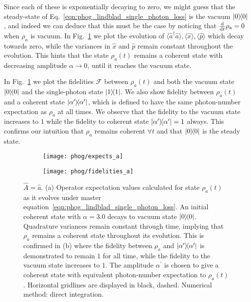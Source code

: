 \noindent Since each of these is exponentially decaying to zero, we might guess that the steady-state of Eq.~\ref{eqn:phog_lindblad_single_photon_loss} is the vacuum $\dyad{0}$, and indeed we can deduce that this must be the case by noticing that $\frac{\mathrm{d}}{\mathrm{d}t} \rho_a = 0$ when $\rho_a$ is vacuum. In Fig.~\ref{fig:phog_lindblad_single_photon_loss} we plot the evolution of $\langle\hat{a}^\dagger \hat{a}\rangle, \langle \hat{x}\rangle, \langle \hat{p}\rangle$ which decay towards zero, while the variances in $\hat{x}$ and $\hat{p}$ remain constant throughout the evolution. This hints that the state $\rho_a\left(t\right)$ remains a coherent state with decreasing amplitude $\alpha\rightarrow0$, until it reaches the vacuum state.

In Fig.~\ref{fig:phog_lindblad_single_photon_loss} we plot the fidelities $\mathcal{F}$ between $\rho_a\left(t\right)$ and both the vacuum state $\dyad{0}$ and the single-photon state $\dyad{1}$. We also show fidelity between $\rho_a\left(t\right)$ and a coherent state $\dyad{\alpha^\prime}$, which is defined to have the same photon-number expectation as $\rho_a$ at all times. We observe that the fidelity to the vacuum state increases to $1$ while the fidelity to coherent state $\dyad{\alpha^\prime}=1$ always. This confirms our intuition that $\rho_a$ remains coherent $\forall t$ and that $\dyad{0}$ is the steady state. 


\begin{figure}[htp]
\captionsetup{width=\linewidth}
\centering
	\begin{subfigure}{0.7\linewidth}
	\centering
	\caption{}
	\texttt{[image: phog/expects\_a]}
	\end{subfigure}
	\begin{subfigure}{0.7\linewidth}
	\centering
	\caption{}
	\texttt{[image: phog/fidelities\_a]}
	\end{subfigure}
\caption{\label{fig:phog_lindblad_single_photon_loss}$\hat{A} = \hat{a}$. (a) Operator expectation values calculated for state $\rho_a\left(t\right)$ as it evolves under master equation~\ref{eqn:phog_lindblad_single_photon_loss}. An initial coherent state with $\alpha=3.0$ decays to vacuum state $\dyad{0}$. Quadrature variances remain constant through time, implying that $\rho_a$ remains a coherent state throughout its evolution. This is confirmed in (b) where the fidelity between $\rho_a$ and $\dyad{\alpha^\prime}$ is demonstrated to remain $1$ for all time, while the fidelity to the vacuum state increases to $1$. The amplitude $\alpha^\prime$ is chosen to give a coherent state with equivalent photon-number expectation to $\rho_a\left(t\right)$. Horizontal gridlines are displayed in black, dashed. Numerical method: direct integration.}
\end{figure}


